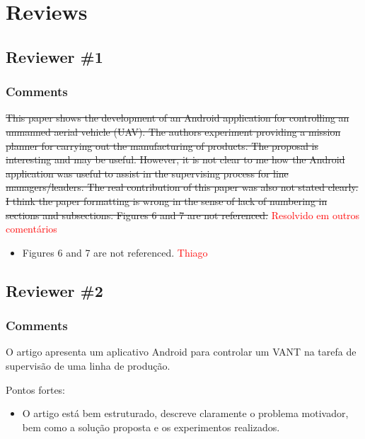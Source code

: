 \documentclass[12pt]{article}
\begin{document}
\setcounter{secnumdepth}{0}

\section{Reviews}

\subsection{Reviewer \#1}

\subsubsection{Comments}

\sout{This paper shows the development of an Android application for controlling an unmanned aerial vehicle (UAV). The authors experiment providing a mission planner for carrying out  the manufacturing of products. The proposal is interesting and may be useful. However, it is not clear to me how the Android application was useful to assist in the supervising process for line managers/leaders. The real contribution of this paper was also not stated clearly. I think the paper formatting is wrong in the sense of lack of numbering in sections and subsections. Figures 6 and 7 are not referenced.} \textcolor{red}{Resolvido em outros comentários}

\begin{itemize}
\item Figures 6 and 7 are not referenced. \textcolor{red}{Thiago}
\end{itemize}

\subsection{Reviewer \#2}

\subsubsection{Comments}

O artigo apresenta um aplicativo Android para controlar um VANT na tarefa de supervisão de uma linha de produção.

Pontos fortes:

\begin{itemize}
\item O artigo está bem estruturado, descreve claramente o problema motivador, bem como a solução proposta e os experimentos realizados.
\end{itemize}
\end{document}
